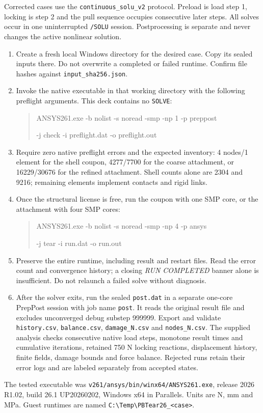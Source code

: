 \documentclass[10pt,a4paper]{article}
\newcommand{\ReportHeading}[1]{\par\vspace{6pt}{\large\bfseries\color{Teal}#1}\par\vspace{3pt}}
\begin{document}
Corrected cases use the \texttt{continuous\_solu\_v2} protocol. Preload is load step 1, locking is step 2 and the pull sequence occupies consecutive later steps. All solves occur in one uninterrupted \texttt{/SOLU} session. Postprocessing is separate and never changes the active nonlinear solution.

\ReportHeading{Run in ANSYS 2026 R1}
\begin{enumerate}
\item Create a fresh local Windows directory for the desired case. Copy its sealed inputs there. Do not overwrite a completed or failed runtime. Confirm file hashes against \texttt{input\_sha256.json}.
\item Invoke the native executable in that working directory with the following preflight arguments. This deck contains no \texttt{SOLVE}:
\begin{quote}\small\ttfamily
ANSYS261.exe -b nolist -s noread -smp -np 1 -p preppost\par
-j check -i preflight.dat -o preflight.out
\end{quote}
\item Require zero native preflight errors and the expected inventory: 4 nodes/1 element for the shell coupon, 4277/7700 for the coarse attachment, or 16229/30676 for the refined attachment. Shell counts alone are 2304 and 9216; remaining elements implement contacts and rigid links.
\item Once the structural license is free, run the coupon with one SMP core, or the attachment with four SMP cores:
\begin{quote}\small\ttfamily
ANSYS261.exe -b nolist -s noread -smp -np 4 -p ansys\par
-j tear -i run.dat -o run.out
\end{quote}
\item Preserve the entire runtime, including result and restart files. Read the error count and convergence history; a closing \emph{RUN COMPLETED} banner alone is insufficient. Do not relaunch a failed solve without diagnosis.
\item After the solver exits, run the sealed \texttt{post.dat} in a separate one-core PrepPost session with job name \texttt{post}. It reads the original result file and excludes unconverged debug substep 999999. Export and validate \texttt{history.csv}, \texttt{balance.csv}, \texttt{damage\_N.csv} and \texttt{nodes\_N.csv}. The supplied analysis checks consecutive native load steps, monotone result times and cumulative iterations, retained 750 N locking reactions, displacement history, finite fields, damage bounds and force balance. Rejected runs retain their error logs and are labeled separately from accepted states.
\end{enumerate}
The tested executable was \texttt{v261/ansys/bin/winx64/ANSYS261.exe}, release 2026 R1.02, build 26.1 UP20260202, Windows x64 in Parallels. Units are N, mm and MPa. Guest runtimes are named \texttt{C:\textbackslash Temp\textbackslash PBTear26\_<case>}.
\end{document}
